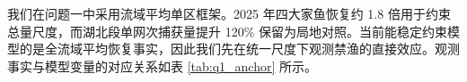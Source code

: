 我们在问题一中采用流域平均单区框架。2025 年四大家鱼恢复约 1.8 倍用于约束总量尺度，而湖北段单网次捕获量提升 120\% 保留为局地对照。当前能稳定约束模型的是全流域平均恢复事实，因此我们先在统一尺度下观测禁渔的直接效应。观测事实与模型变量的对应关系如表 \ref{tab:q1_anchor} 所示。
